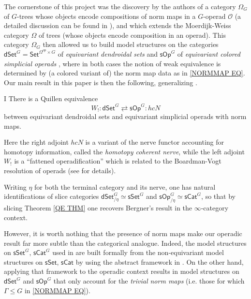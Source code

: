 \documentclass[a4paper,10pt
,draft
]{article}%
\numberwithin{equation}{section}
\numberwithin{figure}{section}
\theoremstyle{definition} %
\newcommand{\sOp}{\ensuremath{\mathsf{sOp}}}%
\newcommand{\dSet}{\mathsf{dSet}}
\renewcommand{\O}{\ensuremath{\mathcal O}}
\newcommand{\1}{\ensuremath{\mathbbm 1}}%
\begin{document}
The cornerstone of this project was the discovery by the authors of 
a category $\Omega_G$ of $G$-trees 
whose objects encode compositions of norm maps
in a $G$-operad $\O$
(a detailed discussion can be found in \cite[\S 4.3]{Per18}),
and which extends the Moerdijk-Weiss category $\Omega$
of trees (whose objects encode composition in an operad).
This category $\Omega_G$
then allowed us to build model structures
on the categories
$\mathsf{dSet}^G = \mathsf{Set}^{\Omega^{op} \times G}$
of \emph{equivariant dendroidal sets}
\cite[Thm. 2.1]{Per18}
and $\mathsf{sOp}^G$
of \emph{equivariant colored simplicial operads}
\cite[Thm. \ref{AC-THMA}]{BP_ACOP},
where in both cases the notion of weak equivalence
is determined by (a colored variant of) the norm map data as in 
\eqref{NORMMAP EQ}.
Our main result in this paper is then the following,
generalizing \cite[Thm. 8.15]{CM13b}.
\begin{customthm}{I}\label{QE THM}
	There is a Quillen equivalence
	\begin{equation}
	\label{QE_EQ}
	W_! \colon \dSet^G \rightleftarrows \sOp^G \colon hcN
	\end{equation}
	between equivariant dendroidal sets and
	equivariant simplicial operads with norm maps.
\end{customthm}
Here the right adjoint $hcN$
is a variant of the nerve functor accounting for homotopy information,
called the \emph{homotopy coherent nerve},
while the left adjoint $W_!$
is a ``fattened operadification'' 
which is related to the Boardman-Vogt resolution of operads
(see \cite[\S 4]{CM13b} for details).



Writing $\eta$ for both the terminal category and its nerve,
one has natural identifications
of slice categories
$\mathsf{dSet}^G_{/\eta} \simeq 
\mathsf{sSet}^G$
and
$\mathsf{sOp}^G_{/\eta} \simeq 
\mathsf{sCat}^G$,
so that by slicing Theorem \ref{QE THM}
one recovers 
Bergner's result \cite{Ber17}
in the $\infty$-category context.

However, it is worth nothing that
the presence of norm maps make 
our operadic result far more subtle
than the categorical analogue.
Indeed, the model structures on 
$\mathsf{sSet}^G$, $\mathsf{sCat}^G$
used in \cite{Ber17}
are built formally from the non-equivariant model structures
on $\mathsf{sSet}$, $\mathsf{sCat}$
by using the abstract framework in \cite{Ste16}.
On the other hand, applying that framework to the operadic context results in model structures
on 
$\mathsf{dSet}^G$
and
$\mathsf{sOp}^G$
that only account for the \emph{trivial norm maps}
(i.e. those for which $\Gamma \leq G$ in \eqref{NORMMAP EQ}).
\end{document}
